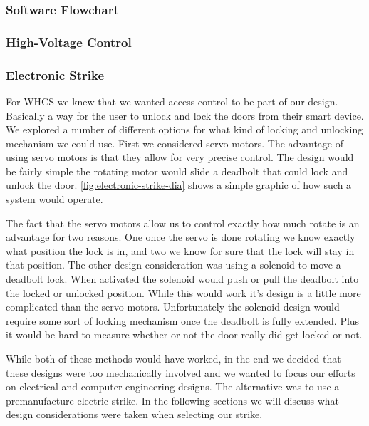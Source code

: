 \subsubsection{Software Flowchart}

\subsubsection{High-Voltage Control}

\subsubsection{Electronic Strike}

\label{sec:electronic-strike}

For WHCS we knew that we wanted access control to be part of our design.
Basically a way for the user to unlock and lock the doors from their smart
device. We explored a number of different options for what kind of locking and
unlocking mechanism we could use. First we considered servo motors. The
advantage of using servo motors is that they allow for very precise control.
The design would be fairly simple the rotating motor would slide a deadbolt
that could lock and unlock the door. \autoref{fig:electronic-strike-dia} shows a simple
graphic of how such a system would operate.

 
The fact that the servo motors allow us to control exactly how much rotate is
an advantage for two reasons. One once the servo is done rotating we know
exactly what position the lock is in, and two we know for sure that the lock
will stay in that position. The other design consideration was using a solenoid
to move a deadbolt lock. When activated the solenoid would push or pull the
deadbolt into the locked or unlocked position. While this would work it{}'s
design is a little more complicated than the servo motors. Unfortunately the
solenoid design would require some sort of locking mechanism once the deadbolt
is fully extended. Plus it would be hard to measure whether or not the door
really did get locked or not.

While both of these methods would have worked, in the end we decided that these
designs were too mechanically involved and we wanted to focus our efforts on
electrical and computer engineering designs. The alternative was to use a
premanufacture electric strike. In the following sections we will discuss what
design considerations were taken when selecting our strike.


